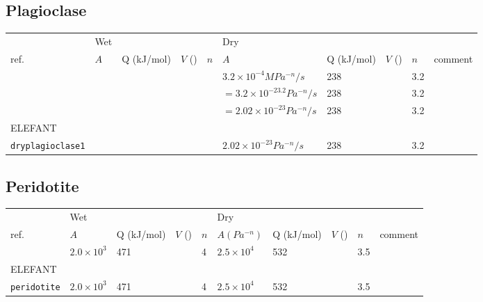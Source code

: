 \subsection{Plagioclase}

\begin{tabular}{|l|llll|llll|p{4cm}|}
\hline
         & Wet                   &            &        &       & Dry           &           &        &     &\\
ref.     & $A$        & Q (kJ/mol) & $V$ () & $n$   & $A $ & Q (kJ/mol) & $V$ () & $n$ & comment\\
\hline\hline
\cite{rana00} &                       &            &        &       & $3.2\times10^{-4}MPa^{-n}/s$ & 238    &        & 3.2 & \\
              &                       &            &         &      & $=3.2\times10^{-23.2}Pa^{-n}/s$ & 238    &        & 3.2 & \\
              &                       &            &         &      & $=2.02\times10^{-23}Pa^{-n}/s$ & 238    &        & 3.2 & \\
\hline\hline
ELEFANT & &&&&&&&&\\
{\tt dryplagioclase1} &                       &            &         &      & $2.02\times10^{-23}Pa^{-n}/s$ & 238    &        & 3.2 & \\
\hline
\end{tabular}

\subsection{Peridotite}

\begin{tabular}{|l|llll|llll|p{4cm}|}
\hline
         & Wet                   &            &        &       & Dry           &           &        &     &\\
ref.     & $A$        & Q (kJ/mol) & $V$ () & $n$   & $A (Pa^{-n})$ & Q (kJ/mol) & $V$ () & $n$ & comment\\
\hline\hline
\cite{rana00} & $2.0\times10^3$       & 471        &        & 4     & $2.5\times10^{4}$ & 532   &        & 3.5 & \\
\hline\hline
ELEFANT & &&&&&&&&\\
{\tt peridotite} & $2.0\times10^3$       & 471        &        & 4     & $2.5\times10^{4}$ & 532   &        & 3.5 & \\
\hline
\end{tabular}


